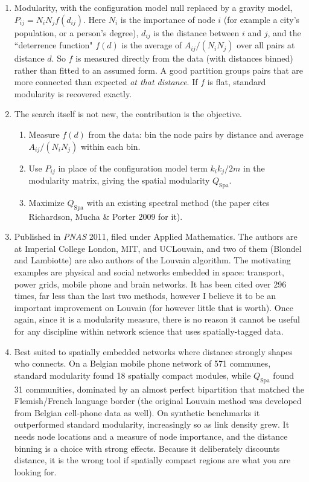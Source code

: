\documentclass{article}
\newcommand{\nc}[1]{(#1)}
\begin{document}
\begin{enumerate}
\begin{itemize}
        \begin{enumerate}
            \item Modularity, with the configuration model null replaced by a gravity model, $P_{ij} = N_i N_j f(d_{ij})$. Here $N_i$ is the importance of node $i$ (for example a city's population, or a person's degree), $d_{ij}$ is the distance between $i$ and $j$, and the ``deterrence function" $f(d)$ is the average of $A_{ij}/(N_iN_j)$ over all pairs at distance $d$. So $f$ is measured directly from the data (with distances binned) rather than fitted to an assumed form. A good partition groups pairs that are more connected than expected \textit{at that distance}. If $f$ is flat, standard modularity is recovered exactly.
            \item The search itself is not new, the contribution is the objective.
            \begin{enumerate}
                \item[\nc 1] Measure $f(d)$ from the data: bin the node pairs by distance and average $A_{ij}/(N_iN_j)$ within each bin.
                \item[\nc 2] Use $P_{ij}$ in place of the configuration model term $k_ik_j/2m$ in the modularity matrix, giving the spatial modularity $Q_{\text{Spa}}$.
                \item[\nc 3] Maximize $Q_{\text{Spa}}$ with an existing spectral method (the paper cites Richardson, Mucha \& Porter 2009 for it).
            \end{enumerate}
            \item Published in \textit{PNAS} 2011, filed under Applied Mathematics. The authors are at Imperial College London, MIT, and UCLouvain, and two of them (Blondel and Lambiotte) are also authors of the Louvain algorithm. The motivating examples are physical and social networks embedded in space: transport, power grids, mobile phone and brain networks. It has been cited over 296 times, far less than the last two methods, however I believe it to be an important improvement on Louvain (for however little that is worth). Once again, since it is a modularity measure, there is no reason it cannot be useful for any discipline within network science that uses spatially-tagged data.
            \item Best suited to spatially embedded networks where distance strongly shapes who connects. On a Belgian mobile phone network of 571 communes, standard modularity found 18 spatially compact modules, while $Q_{\text{Spa}}$ found 31 communities, dominated by an almost perfect bipartition that matched the Flemish/French language border (the original Louvain method was developed from Belgian cell-phone data as well). On synthetic benchmarks it outperformed standard modularity, increasingly so as link density grew. It needs node locations and a measure of node importance, and the distance binning is a choice with strong effects. Because it deliberately discounts distance, it is the wrong tool if spatially compact regions are what you are looking for.

\end{enumerate}
\end{itemize}
\end{enumerate}
\end{document}
